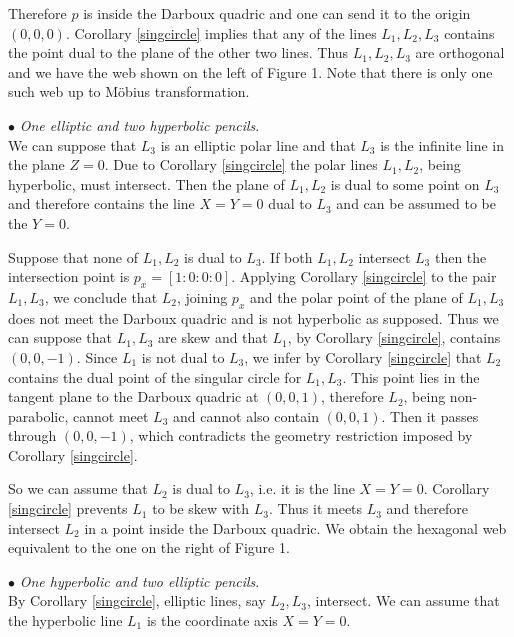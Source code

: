 \documentclass[11pt,a4paper]{article}
\begin{document}
Therefore $p$ is inside the Darboux quadric and one can send it to the origin $(0,0,0)$.     
Corollary \ref{singcircle} implies that any of the lines $L_1,L_2,L_3$ contains the point dual to the plane of the other two lines. Thus $L_1,L_2,L_3$   are orthogonal and 
 we have the web shown on the  left of Figure 1. Note that  there is only one such web  up to M\"obius transformation.







{$\bullet$ \it One elliptic and two hyperbolic pencils}.\\ 
We can suppose that $L_3$ is an elliptic polar line and that $L_3$ is the infinite line  in the plane $Z=0$. Due to Corollary \ref{singcircle} the polar lines $L_1,L_2$, being hyperbolic, must intersect.  Then the plane of $L_1,L_2$ is dual to some point on $L_3$ and therefore  contains the line $X=Y=0$ dual to $L_3$ and can be assumed to be the  $Y=0$.

Suppose that none of $L_1,L_2$ is dual to $L_3$. If both $L_1,L_2$ intersect $L_3$ then the intersection point is $p_x=[1:0:0:0]$. Applying Corollary \ref{singcircle}  to the pair $L_1,L_3$, we conclude that $L_2$, joining $p_x$ and the polar point of the plane of $L_1,L_3$ does not meet the Darboux quadric and is not hyperbolic as supposed. Thus we can suppose that $L_1,L_3$ are skew and that $L_1$, by Corollary \ref{singcircle}, contains $(0,0,-1)$. Since $L_1$ is not dual to $L_3$, we infer by Corollary \ref{singcircle} that $L_2$ contains the dual point of the singular circle  for $L_1,L_3$. This point lies in the tangent plane to the Darboux quadric at $(0,0,1)$, therefore $L_2$, being non-parabolic, cannot meet $L_3$ and cannot also contain $(0,0,1)$. Then it passes through $(0,0,-1)$, which contradicts the geometry restriction imposed by Corollary \ref{singcircle}. 

So we can assume that $L_2$ is dual to $L_3$, i.e. it is the line $X=Y=0$. Corollary  \ref{singcircle} prevents $L_1$ to be skew with $L_3$. Thus it meets $L_3$ and therefore intersect $L_2$ in a point inside the Darboux quadric.        
We obtain the hexagonal web equivalent to the one on the  right of Figure 1.  





{$\bullet$ \it One hyperbolic  and two elliptic pencils}.\\ 
By Corollary \ref{singcircle},  elliptic lines, say $L_2,L_3$, intersect. We can assume that the hyperbolic line $L_1$ is the coordinate axis $X=Y=0$. 
\end{document}
